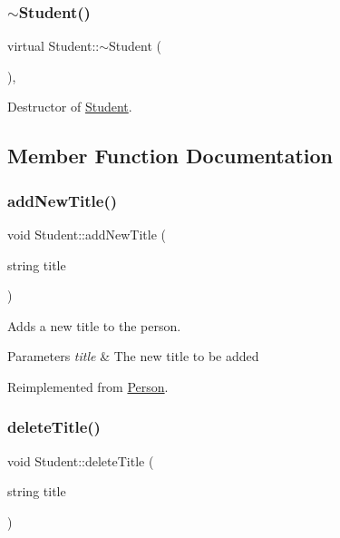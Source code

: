 \subsubsection{\texorpdfstring{$\sim$\+Student()}{~Student()}}
{\footnotesize\ttfamily virtual Student\+::$\sim$\+Student (\begin{DoxyParamCaption}{ }\end{DoxyParamCaption})\hspace{0.3cm}{\ttfamily [inline]}, {\ttfamily [virtual]}}



Destructor of \hyperlink{class_student}{Student}. 



\subsection{Member Function Documentation}
\mbox{\label{class_student_a616e34f2eebf885b3419bcd27e8f3840}} 
\subsubsection{\texorpdfstring{add\+New\+Title()}{addNewTitle()}}
{\footnotesize\ttfamily void Student\+::add\+New\+Title (\begin{DoxyParamCaption}\item[{string}]{title }\end{DoxyParamCaption})\hspace{0.3cm}{\ttfamily [virtual]}}



Adds a new title to the person. 


\begin{DoxyParams}{Parameters}
{\em title} & The new title to be added \\
\hline
\end{DoxyParams}


Reimplemented from \hyperlink{class_person_a1f6361e735885ead2549717bb31d0437}{Person}.

\mbox{\label{class_student_a16d2a2c6abe8aa9ce53a2a15c4656eee}} 
\subsubsection{\texorpdfstring{delete\+Title()}{deleteTitle()}}
{\footnotesize\ttfamily void Student\+::delete\+Title (\begin{DoxyParamCaption}\item[{string}]{title }\end{DoxyParamCaption})\hspace{0.3cm}{\ttfamily [virtual]}}



